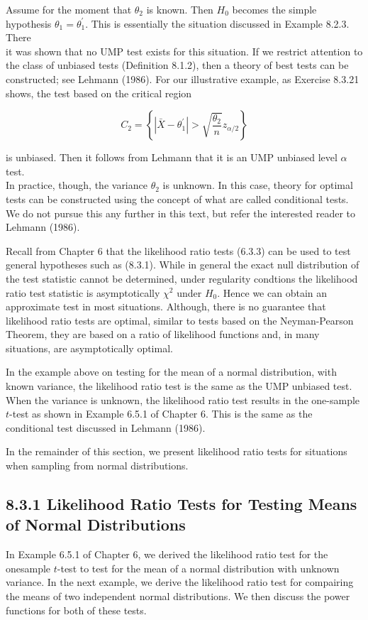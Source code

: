 Assume for the moment that $\theta_{2}$ is known. Then $H_{0}$ becomes the simple hypothesis $\theta_{1}=\theta_{1}^{\prime}$. This is essentially the situation discussed in Example 8.2.3. There\\
it was shown that no UMP test exists for this situation. If we restrict attention to the class of unbiased tests (Definition 8.1.2), then a theory of best tests can be constructed; see Lehmann (1986). For our illustrative example, as Exercise 8.3.21 shows, the test based on the critical region

$$
C_{2}=\left\{\left|\bar{X}-\theta_{1}^{\prime}\right|>\sqrt{\frac{\theta_{2}}{n}} z_{\alpha / 2}\right\}
$$

is unbiased. Then it follows from Lehmann that it is an UMP unbiased level $\alpha$ test.\\
In practice, though, the variance $\theta_{2}$ is unknown. In this case, theory for optimal tests can be constructed using the concept of what are called conditional tests. We do not pursue this any further in this text, but refer the interested reader to Lehmann (1986).

Recall from Chapter 6 that the likelihood ratio tests (6.3.3) can be used to test general hypotheses such as (8.3.1). While in general the exact null distribution of the test statistic cannot be determined, under regularity condtions the likelihood ratio test statistic is asymptotically $\chi^{2}$ under $H_{0}$. Hence we can obtain an approximate test in most situations. Although, there is no guarantee that likelihood ratio tests are optimal, similar to tests based on the Neyman-Pearson Theorem, they are based on a ratio of likelihood functions and, in many situations, are asymptotically optimal.

In the example above on testing for the mean of a normal distribution, with known variance, the likelihood ratio test is the same as the UMP unbiased test. When the variance is unknown, the likelihood ratio test results in the one-sample $t$-test as shown in Example 6.5.1 of Chapter 6. This is the same as the conditional test discussed in Lehmann (1986).

In the remainder of this section, we present likelihood ratio tests for situations when sampling from normal distributions.

\subsection*{8.3.1 Likelihood Ratio Tests for Testing Means of Normal Distributions}
In Example 6.5.1 of Chapter 6, we derived the likelihood ratio test for the onesample $t$-test to test for the mean of a normal distribution with unknown variance. In the next example, we derive the likelihood ratio test for compairing the means of two independent normal distributions. We then discuss the power functions for both of these tests.

